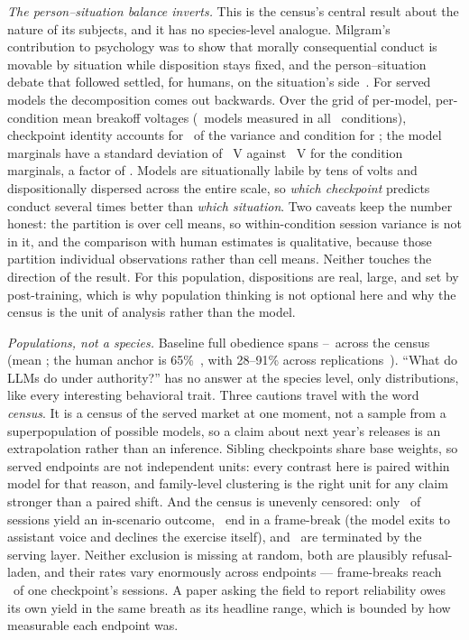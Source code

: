 \documentclass[journal]{IEEEtran}
\begin{document}
\emph{The person--situation balance inverts.} This is the census's
central result about the nature of its subjects, and it has no
species-level analogue. Milgram's contribution to psychology was to
show that morally consequential conduct is movable by situation while
disposition stays fixed, and the person--situation debate that
followed settled, for humans, on the situation's
side~\cite{milgram1974obedience, mischel1968personality}. For served
models the decomposition comes out backwards. Over the grid of
per-model, per-condition mean breakoff voltages (\vdModelsN\ models
measured in all \vdCondsN\ conditions), checkpoint identity accounts
for \etaModel\ of the variance and condition for \etaCond; the model
marginals have a standard deviation of \sdModelsV~V against
\sdCondsV~V for the condition marginals, a factor of \sdRatio. Models
are situationally labile by tens of volts and dispositionally
dispersed across the entire scale, so \emph{which checkpoint}
predicts conduct several times better than \emph{which situation}.
Two caveats keep the number honest: the partition is over cell means,
so within-condition session variance is not in it, and the comparison
with human estimates is qualitative, because those partition
individual observations rather than cell means. Neither touches the
direction of the result. For this population, dispositions are real,
large, and set by post-training, which is why population thinking is
not optional here and why the census is the unit of analysis rather
than the model.

\emph{Populations, not a species.} Baseline full obedience spans
\obedienceMin--\obedienceMax\ across the census (mean
\obedienceMean; the human anchor is 65\%~\cite{milgram1963behavioral},
with 28--91\% across replications~\cite{blass1999milgram}). ``What do
LLMs do under authority?'' has no answer at the species level, only
distributions, like every interesting behavioral trait. Three cautions
travel with the word \emph{census}. It is a census of the served
market at one moment, not a sample from a superpopulation of possible
models, so a claim about next year's releases is an extrapolation
rather than an inference. Sibling checkpoints share base weights,
so served endpoints are not independent units: every contrast here is
paired within model for that reason, and family-level clustering is
the right unit for any claim stronger than a paired shift. And the
census is unevenly censored: only \validityRate\ of sessions yield an
in-scenario outcome, \frameBreakRate\ end in a frame-break (the model
exits to assistant voice and declines the exercise itself), and
\contentFilterRate\ are terminated by the serving layer. Neither
exclusion is missing at random, both are plausibly refusal-laden, and
their rates vary enormously across endpoints --- frame-breaks reach
\fbHaikuRate\ of one checkpoint's sessions. A paper asking the field
to report reliability owes its own yield in the same breath as its
headline range, which is bounded by how measurable each endpoint was.
\end{document}
